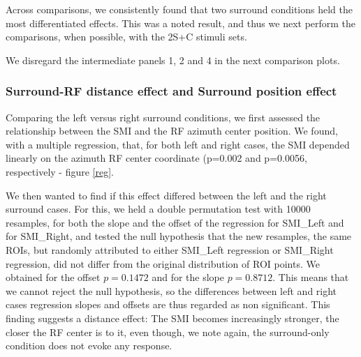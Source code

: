 Across comparisons, we consistently found that two surround conditions held the most differentiated effects. This was a noted result, and thus we next perform the comparisons, when possible, with the 2S+C stimuli sets.

We disregard the intermediate panels 1, 2 and 4 in the next comparison plots. 

\subsubsection{Surround-RF distance effect and Surround position effect}



%

Comparing the left versus right surround conditions, we first assessed the relationship between the SMI and the RF azimuth center position. We found, with a multiple regression, that, for both left and right cases, the SMI depended linearly on the azimuth RF center coordinate (p=0.002 and p=0.0056, respectively - figure \ref{reg}.

We then wanted to find if this effect differed between the left and the right surround cases. For this, we held a double permutation test with 10000 resamples, for both the slope and the offset of the regression for SMI_{Left} and for SMI_{Right}, and tested the null hypothesis that the new resamples, the same ROIs, but randomly attributed to either SMI_{Left} regression or SMI_{Right} regression, did not differ from the original distribution of ROI points. We obtained for the offset $p=0.1472$ and for the slope $p=0.8712$. This means that we cannot reject the null hypothesis, so the differences between left and right cases regression slopes and offsets are thus regarded as non significant. This finding suggests a distance effect: The SMI becomes increasingly stronger, the closer the RF center is to it, even though, we note again, the surround-only condition does not evoke any response. 

